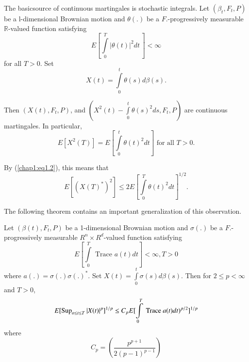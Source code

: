 The basic\pageoriginale source of continuous martingales is stochastic 
integrals. Let $(\beta_t, F_t,P)$ 
be a l-dimensional Brownian motion and  $\theta(.)$ be a
$F$.-progressively measurable $\mathbb{R}$-valued function satisfying  
$$
E \left[\int \limits^T_0 | \theta (t)|^2 dt \, \right] < \infty 
$$
for all $T> 0$. Set
$$
X(t) = \int\limits_{0}^{t} \theta (s) d\beta (s).
$$

Then $(X(t), F_t, P)$, and $(X^2 (t) - \int\limits_{0}^{t} \theta (s)^2
ds, F_t, P)$ are continuous martingales. In particular, 
$$
E[X^2 (T) ] = E \left[ \int\limits_{0}^{t} \theta (t)^2dt \right]
\text { for all } T > 0.  
$$

By (\ref{chap1:eq1.2}), this means that
$$
E [(X (T)^*)^2] \le 2E [ \int\limits_{0}^{T} \theta (t)^2
  dt]^{1/2}. 
$$

The following theorem contains an important generalization of this
observation. 

\setcounter{theorem}{2}
\begin{theorem}[Burkholder] %
Let $(\beta (t), F_t, P)$ be a 1-dimensional Brownian
  motion and $\sigma (.)$ be a $F$.-progressively measurable $R^n
  \times R^d$-valued function satisfying 
$$
E \left[\int\limits_{0}^{T} \text { Trace } a(t) dt \right] < \infty, T > 0 
$$
where $a(.) = \sigma (.) \sigma (.)^* $. Set $X(t) =
\int\limits_{0}^{t} \sigma (s) d \beta (s)$. Then for $2 \le p <
\infty$ and $T > 0$,  
$$
E[ \operatorname{Sup}_{o \le t \le T} | X (t) |^{p}]^{1/p} \leq  C_p E [
  \int\limits_{0}^{T} \text { Trace } a (t) dt)^{p/2}] ^{1/p} 
$$\pageoriginale
where 
$$
C_p = \left( \frac{p^{p+1}}{2(p-1)^{p-1}} \right)
$$
\end{theorem}

